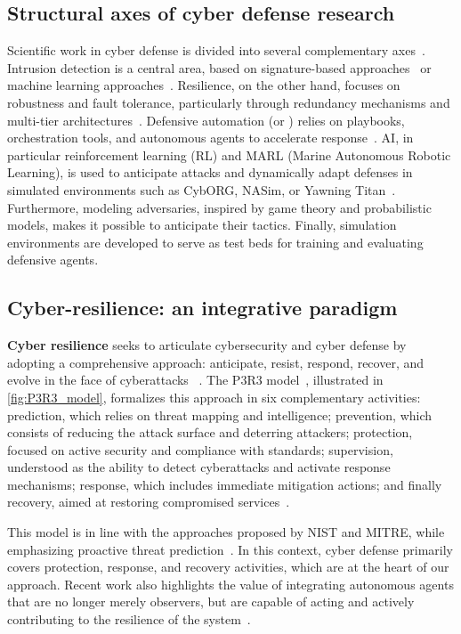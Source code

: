 \subsection*{Structural axes of cyber defense research}

Scientific work in cyber defense is divided into several complementary axes~\cite {Buczak2016}. Intrusion detection is a central area, based on signature-based approaches~\cite{Axelsson2000} or machine learning approaches~\cite{Sommer2010,Buczak2016}. Resilience, on the other hand, focuses on robustness and fault tolerance, particularly through redundancy mechanisms and multi-tier architectures~\cite{Bodeau2011}. Defensive automation (or ) relies on playbooks, orchestration tools, and autonomous agents to accelerate response~\cite {Hazra2022}. AI, in particular reinforcement learning (RL) and MARL (Marine Autonomous Robotic Learning), is used to anticipate attacks and dynamically adapt defenses in simulated environments such as CybORG, NASim, or Yawning Titan~\cite{Standen2021, nasim2023,Andrew2022}. Furthermore, modeling adversaries, inspired by game theory and probabilistic models, makes it possible to anticipate their tactics. Finally, simulation environments are developed to serve as test beds for training and evaluating defensive agents.


\subsection*{Cyber-resilience: an integrative paradigm}

\textbf{Cyber resilience} seeks to articulate cybersecurity and cyber defense by adopting a comprehensive approach: anticipate, resist, respond, recover, and evolve in the face of cyberattacks~\cite{NISTresilience} . The P3R3 model~\cite{Theron2013P3R3}, illustrated in \autoref{fig:P3R3_model}, formalizes this approach in six complementary activities: prediction, which relies on threat mapping and intelligence; prevention, which consists of reducing the attack surface and deterring attackers; protection, focused on active security and compliance with standards; supervision, understood as the ability to detect cyberattacks and activate response mechanisms; response, which includes immediate mitigation actions; and finally recovery, aimed at restoring compromised services~\cite{Theron2013P3R3}.

This model is in line with the approaches proposed by NIST and MITRE, while emphasizing proactive threat prediction~\cite{Theron2013P3R3}. In this context, cyber defense primarily covers protection, response, and recovery activities, which are at the heart of our approach. Recent work also highlights the value of integrating autonomous agents that are no longer merely observers, but are capable of acting and actively contributing to the resilience of the system~\cite {Kott2023}.

